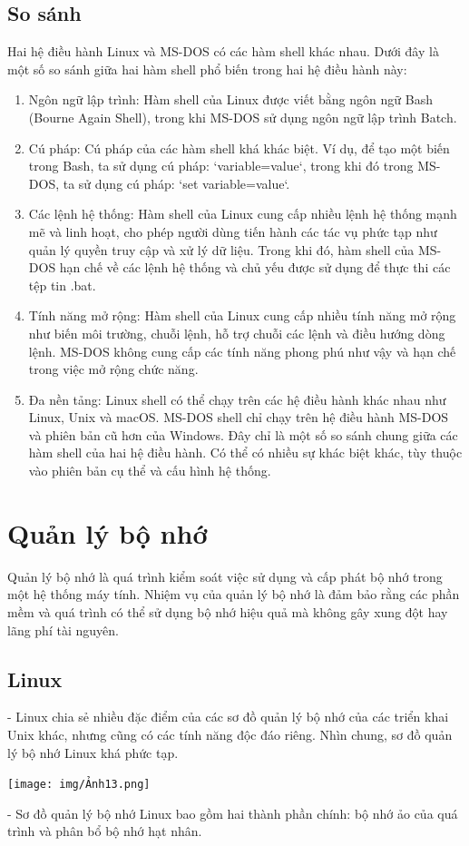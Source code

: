 \documentclass[12pt,a4paper]{article}
\begin{document}
\subsection{So sánh}
Hai hệ điều hành Linux và MS-DOS có các hàm shell khác nhau. Dưới đây là một số so sánh giữa hai hàm shell phổ biến trong hai hệ điều hành này:
\begin{enumerate}
	\item Ngôn ngữ lập trình: Hàm shell của Linux được viết bằng ngôn ngữ Bash (Bourne Again Shell), trong khi MS-DOS sử dụng ngôn ngữ lập trình Batch.
	\item Cú pháp: Cú pháp của các hàm shell khá khác biệt. Ví dụ, để tạo một biến trong Bash, ta sử dụng cú pháp: `variable=value`, trong khi đó trong MS-DOS, ta sử dụng cú pháp: `set variable=value`.
	\item Các lệnh hệ thống: Hàm shell của Linux cung cấp nhiều lệnh hệ thống mạnh mẽ và linh hoạt, cho phép người dùng tiến hành các tác vụ phức tạp như quản lý quyền truy cập và xử lý dữ liệu. Trong khi đó, hàm shell của MS-DOS hạn chế về các lệnh hệ thống và chủ yếu được sử dụng để thực thi các tệp tin .bat.
	\item Tính năng mở rộng: Hàm shell của Linux cung cấp nhiều tính năng mở rộng như biến môi trường, chuỗi lệnh, hỗ trợ chuỗi các lệnh và điều hướng dòng lệnh. MS-DOS không cung cấp các tính năng phong phú như vậy và hạn chế trong việc mở rộng chức năng.
	\item Đa nền tảng: Linux shell có thể chạy trên các hệ điều hành khác nhau như Linux, Unix và macOS. MS-DOS shell chỉ chạy trên hệ điều hành MS-DOS và phiên bản cũ hơn của Windows. Đây chỉ là một số so sánh chung giữa các hàm shell của hai hệ điều hành. Có thể có nhiều sự khác biệt khác, tùy thuộc vào phiên bản cụ thể và cấu hình hệ thống.
\end{enumerate}
\section{Quản lý bộ nhớ}
Quản lý bộ nhớ là quá trình kiểm soát việc sử dụng và cấp phát bộ nhớ trong một hệ thống máy tính. Nhiệm vụ của quản lý bộ nhớ là đảm bảo rằng các phần mềm và quá trình có thể sử dụng bộ nhớ hiệu quả mà không gây xung đột hay lãng phí tài nguyên.
\subsection{Linux}
- Linux chia sẻ nhiều đặc điểm của các sơ đồ quản lý bộ nhớ của các triển khai Unix khác, nhưng cũng có các tính năng độc đáo riêng. Nhìn chung, sơ đồ quản lý bộ nhớ Linux khá phức tạp.\\
\begin{center}
	\texttt{[image: img/Ảnh13.png]}
\end{center}
- Sơ đồ quản lý bộ nhớ Linux bao gồm hai thành phần chính: bộ nhớ ảo của quá trình và phân bổ bộ nhớ hạt nhân.\\
\end{document}
